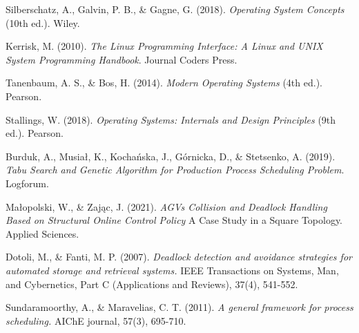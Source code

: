 \documentclass[12pt]{article}
\begin{document}
\vspace{5cm}
\begin{thebibliography}{9}

    Silberschatz, A., Galvin, P. B., \& Gagne, G. (2018). \textit{Operating System Concepts} (10th ed.). Wiley.
    
    Kerrisk, M. (2010). \textit{The Linux Programming Interface: A Linux and UNIX System Programming Handbook}. Journal Coders Press.
    
    Tanenbaum, A. S., \& Bos, H. (2014). \textit{Modern Operating Systems} (4th ed.). Pearson.
    
    Stallings, W. (2018). \textit{Operating Systems: Internals and Design Principles} (9th ed.). Pearson.

    Burduk, A., Musiał, K., Kochańska, J., Górnicka, D., \& Stetsenko, A. (2019). \textit{Tabu Search and Genetic Algorithm for Production Process Scheduling Problem}. Logforum.

    Małopolski, W., \& Zając, J. (2021). \textit{AGVs Collision and Deadlock Handling Based on Structural Online Control Policy} A Case Study in a Square Topology. Applied Sciences.

    Dotoli, M., \& Fanti, M. P. (2007). \textit{Deadlock detection and avoidance strategies for automated storage and retrieval systems.} IEEE Transactions on Systems, Man, and Cybernetics, Part C (Applications and Reviews), 37(4), 541-552.

    Sundaramoorthy, A., \& Maravelias, C. T. (2011). \textit{A general framework for process scheduling.} AIChE journal, 57(3), 695-710.
    
    \end{thebibliography}
\end{document}
